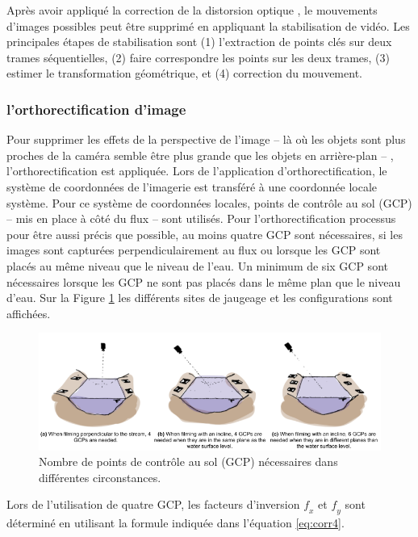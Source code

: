 \documentclass[
]{article}
\begin{document}
Après avoir appliqué la correction de la distorsion optique , le mouvements d'images possibles
peut être supprimé en appliquant la stabilisation de vidéo. Les principales étapes de
stabilisation sont (1) l'extraction de points clés sur deux trames séquentielles,
(2) faire correspondre les points sur les deux trames, (3) estimer le
transformation géométrique, et (4) correction du mouvement.

\hypertarget{lorthorectification-dimage}{%
\subsubsection*{l'orthorectification d'image}\label{lorthorectification-dimage}}

Pour supprimer les effets de la perspective de l'image -- là où les objets sont plus proches
de la caméra semble être plus grande que les objets en arrière-plan -- ,
l'orthorectification est appliquée. Lors de l'application d'orthorectification,
le système de coordonnées de l'imagerie est transféré à une coordonnée locale
système. Pour ce système de coordonnées locales, points de contrôle au sol (GCP) --
mis en place à côté du flux -- sont utilisés. Pour l'orthorectification
processus pour être aussi précis que possible, au moins quatre GCP sont nécessaires, si
les images sont capturées perpendiculairement au flux ou lorsque les GCP
sont placés au même niveau que le niveau de l'eau. Un minimum de six
GCP sont nécessaires lorsque les GCP ne sont pas placés dans le même plan que le
niveau d'eau. Sur la Figure \ref{fig:ortho} les différents sites de jaugeage
et les configurations sont affichées.



\begin{figure}
\includegraphics[width=1\linewidth]{images/ortho} \caption{Nombre de points de contrôle au sol (GCP) nécessaires dans différentes circonstances.}\label{fig:ortho}
\end{figure}

Lors de l'utilisation de quatre GCP, les facteurs d'inversion \(𝑓_𝑥\) et \(𝑓_𝑦\) sont
déterminé en utilisant la formule indiquée dans l'équation \eqref{eq:corr4}.
\end{document}
